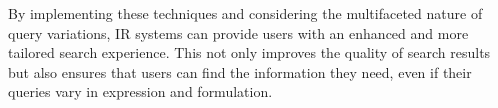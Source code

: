 By implementing these techniques and considering the multifaceted nature of query variations, IR systems can provide users with an enhanced and more tailored search experience. This not only improves the quality of search results but also ensures that users can find the information they need, even if their queries vary in expression and formulation.